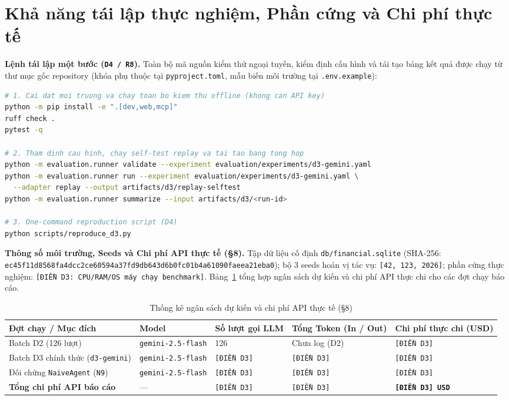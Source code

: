 \section{Khả năng tái lập thực nghiệm, Phần cứng và Chi phí thực tế}
\label{app:repro}

\noindent \textbf{Lệnh tái lập một bước (\texttt{D4 / R8}).} Toàn bộ mã nguồn kiểm thử ngoại tuyến, kiểm định cấu hình và tái tạo bảng kết quả được chạy từ thư mục gốc repository (khóa phụ thuộc tại \texttt{pyproject.toml}, mẫu biến môi trường tại \texttt{.env.example}):

\begin{lstlisting}[language=bash, caption={Lệnh cài đặt, kiểm chứng và tái lập thực nghiệm một bước}]
# 1. Cai dat moi truong va chay toan bo kiem thu offline (khong can API key)
python -m pip install -e ".[dev,web,mcp]"
ruff check .
pytest -q

# 2. Tham dinh cau hinh, chay self-test replay va tai tao bang tong hop
python -m evaluation.runner validate --experiment evaluation/experiments/d3-gemini.yaml
python -m evaluation.runner run --experiment evaluation/experiments/d3-gemini.yaml \
  --adapter replay --output artifacts/d3/replay-selftest
python -m evaluation.runner summarize --input artifacts/d3/<run-id>

# 3. One-command reproduction script (D4)
python scripts/reproduce_d3.py
\end{lstlisting}

\noindent \textbf{Thông số môi trường, Seeds và Chi phí API thực tế (\S 8).} Tập dữ liệu cố định \texttt{db/financial.sqlite} (SHA-256: \texttt{ec45f11d8568fa4dcc2ce60594a37fd9db643d6b0fc01b4a61090faeea21eba0}); bộ 3 seeds hoán vị tác vụ: \texttt{[42, 123, 2026]}; phần cứng thực nghiệm: \texttt{[ĐIỀN D3: CPU/RAM/OS máy chạy benchmark]}. Bảng~\ref{tab:actual-spend} tổng hợp ngân sách dự kiến và chi phí API thực chi cho các đợt chạy báo cáo.

\begin{table}[H]
\centering
\caption{Thống kê ngân sách dự kiến và chi phí API thực tế (\S 8)}
\label{tab:actual-spend}
\footnotesize
\renewcommand{\arraystretch}{1.15}
\begin{tabular}{|l|l|l|l|l|}
\hline
\rowcolor{tableheader}
\textbf{Đợt chạy / Mục đích} & \textbf{Model} & \textbf{Số lượt gọi LLM} & \textbf{Tổng Token (In / Out)} & \textbf{Chi phí thực chi (USD)} \\ \hline
Batch D2 (126 lượt) & \texttt{gemini-2.5-flash} & 126 & Chưa log (D2) & \texttt{[ĐIỀN D3]} \\ \hline
Batch D3 chính thức (\texttt{d3-gemini}) & \texttt{gemini-2.5-flash} & \texttt{[ĐIỀN D3]} & \texttt{[ĐIỀN D3]} & \texttt{[ĐIỀN D3]} \\ \hline
Đối chứng \texttt{NaiveAgent} (\texttt{N9}) & \texttt{gemini-2.5-flash} & \texttt{[ĐIỀN D3]} & \texttt{[ĐIỀN D3]} & \texttt{[ĐIỀN D3]} \\ \hline
\textbf{Tổng chi phí API báo cáo} & --- & \texttt{[ĐIỀN D3]} & \texttt{[ĐIỀN D3]} & \textbf{\texttt{[ĐIỀN D3] USD}} \\ \hline
\end{tabular}
\end{table}

